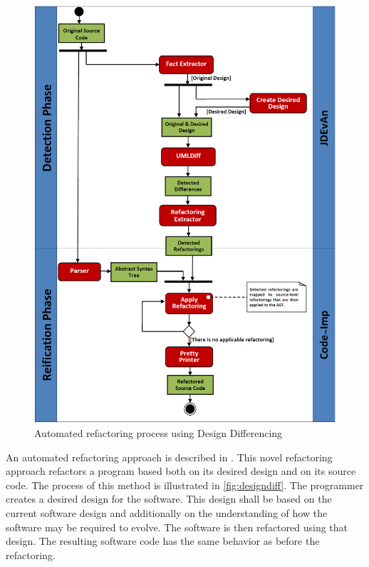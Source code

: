 \documentclass[conference,compsoc,a4paper]{IEEEtran}
\begin{document}
\begin{figure}[t]
  \centering
    \includegraphics[width=\linewidth]{figures/designdiff.png}
  \caption{Automated refactoring process using Design Differencing \cite{design-diff}}
  \label{fig:designdiff}
\end{figure}

An automated refactoring approach is described in \cite{design-diff}. This novel refactoring approach refactors a 
program based both on its desired design and on its source code.
The process of this method is illustrated in \autoref{fig:designdiff}. The programmer creates a desired design for the 
software. This design shall be based on the current software design and additionally on the understanding of how the 
software may be required to evolve. The software is then refactored using that design. The resulting software code has 
the same behavior as before the refactoring.
\end{document}

